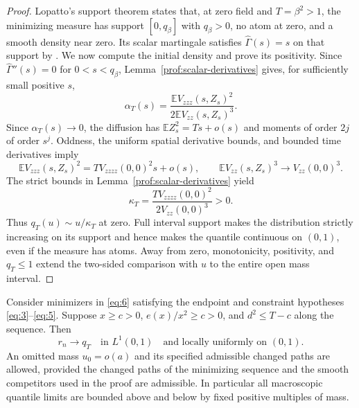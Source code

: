 \begin{proof}
Lopatto's support theorem \cite[Theorem~1.1]{Lopatto2026} states
that, at zero field and $T=\beta^2>1$, the minimizing measure has
support $[0,q_\beta]$ with $q_\beta>0$, no atom at zero, and a smooth
density near zero. Its scalar martingale satisfies
$\widehat\Gamma(s)=s$ on that support by
\cite[Lemma~2.2, equation~(2.3)]{Lopatto2026}.
We now compute the initial density and prove its positivity.
Since $\widehat\Gamma''(s)=0$ for $0<s<q_\beta$,
Lemma~\ref{prof:scalar-derivatives} gives, for sufficiently small
positive $s$,
\[
 \alpha_T(s)=
 \frac{\mathbb E V_{zzz}(s,Z_s)^2}
      {2\mathbb E V_{zz}(s,Z_s)^3}.
\]
Since $\alpha_T(s)\to0$, the diffusion has
$\mathbb E Z_s^2=Ts+o(s)$ and moments of order $2j$ of order $s^j$.
Oddness, the uniform spatial derivative bounds, and bounded time
derivatives imply
\[
 \mathbb E V_{zzz}(s,Z_s)^2
       =T V_{zzzz}(0,0)^2s+o(s),\qquad
 \mathbb E V_{zz}(s,Z_s)^3\longrightarrow V_{zz}(0,0)^3.
\]
The strict bounds in Lemma~\ref{prof:scalar-derivatives} yield
\[
 \kappa_T=\frac{T V_{zzzz}(0,0)^2}{2V_{zz}(0,0)^3}>0.
\]
Thus $q_T(u)\sim u/\kappa_T$ at zero. Full interval support makes
the distribution strictly increasing on its support and hence
makes the quantile continuous on $(0,1)$, even if the measure
has atoms. Away from zero, monotonicity, positivity, and
$q_T\le1$ extend the two-sided comparison with $u$ to the entire
open mass interval.
\end{proof}

\begin{proposition}
\label{prof:macro-profile}
Consider minimizers in \eqref{eq:6} satisfying the endpoint and
constraint hypotheses \eqref{eq:3}--\eqref{eq:5}. Suppose
$x\ge c>0$, $e(x)/x^2\ge c>0$, and $d^2\le T-c$ along the
sequence. Then
\[
 r_n\longrightarrow q_T\quad\text{in }L^1(0,1)
 \quad\text{and locally uniformly on }(0,1).
\]
An omitted mass $u_0=o(a)$ and its specified admissible changed
paths are allowed, provided the changed paths of the minimizing
sequence and the smooth competitors used in the proof are admissible.
In particular all macroscopic quantile limits
are bounded above and below by fixed positive multiples of mass.
\end{proposition}

